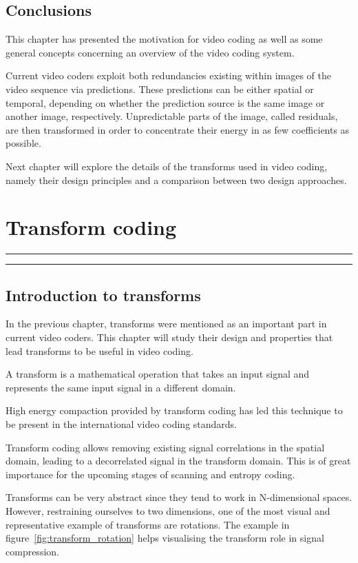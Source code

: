 \documentclass[11pt,a4paper,openright,twoside]{book}
\providecommand{\chaptertoc}{
	\startcontents[chapters]
	\hrule
	\vspace{1em}
	\printcontents[chapters]{}{1}{{\bf\large Contents}}
	\hrule
}
\numberwithin{equation}{section} %
\numberwithin{figure}{section} %
\numberwithin{table}{section} %
\begin{document}
\section{Conclusions}
\label{sec:conclusions_video_coding}

This chapter has presented the motivation for video coding as well as
some general concepts concerning an overview of the video coding system.

Current video coders exploit both redundancies existing within images of
the video sequence via predictions.
These predictions can be either spatial or temporal, depending on
whether the prediction source is the same image or another image,
respectively.
Unpredictable parts of the image, called residuals, are then transformed
in order to concentrate their energy in as few coefficients as possible.

Next chapter will explore the details of the transforms used in video
coding, namely their design principles and a comparison between two
design approaches.

\chapter{Transform coding}
\label{cha:transform_coding}
\chaptertoc

\section{Introduction to transforms}
\label{sec:introduction_to_transforms}

In the previous chapter, transforms were mentioned as an important part
in current video coders.
This chapter will study their design and properties that lead transforms
to be useful in video coding.

A transform is a mathematical operation that takes an input signal and
represents the same input signal in a different domain.

High energy compaction provided by transform coding has led this
technique to be present in the international video coding standards.

Transform coding allows removing existing signal correlations in the
spatial domain, leading to a decorrelated signal in the transform
domain.
This is of great importance for the upcoming stages of scanning and
entropy coding.

Transforms can be very abstract since they tend to work in N-dimensional
spaces.
However, restraining ourselves to two dimensions, one of the most visual
and representative example of transforms are rotations.
The example in figure~\ref{fig:transform_rotation} helps visualising the
transform role in signal compression.
\end{document}
